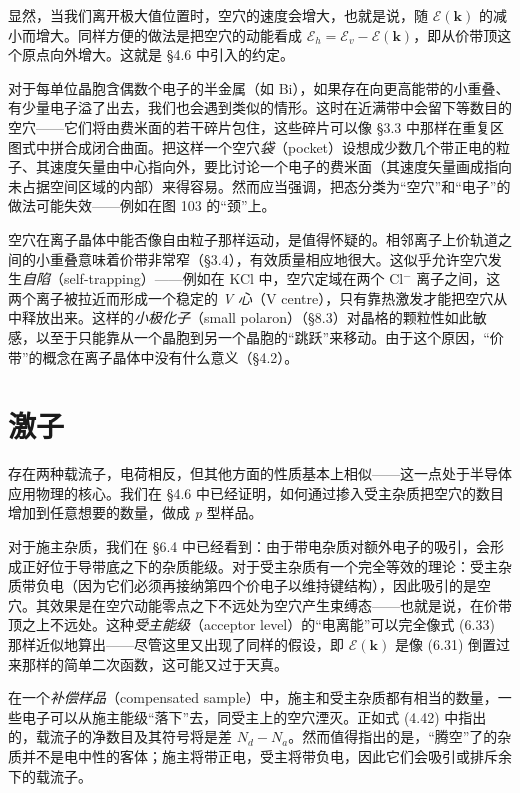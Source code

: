 显然，当我们离开极大值位置时，空穴的速度会增大，也就是说，随 $\mathcal{E}(\mathbf{k})$ 的减小而增大。同样方便的做法是把空穴的动能看成 $\mathcal{E}_{h}=\mathcal{E}_{v}-\mathcal{E}(\mathbf{k})$，即从价带顶这个原点向外增大。这就是 §4.6 中引入的约定。

对于每单位晶胞含偶数个电子的半金属（如 Bi），如果存在向更高能带的小重叠、有少量电子溢了出去，我们也会遇到类似的情形。这时在近满带中会留下等数目的空穴——它们将由费米面的若干碎片包住，这些碎片可以像 §3.3 中那样在重复区图式中拼合成闭合曲面。把这样一个空穴\emph{袋}（pocket）设想成少数几个带正电的粒子、其速度矢量由中心指向外，要比讨论一个电子的费米面（其速度矢量画成指向未占据空间区域的内部）来得容易。然而应当强调，把态分类为“空穴”和“电子”的做法可能失效——例如在图 103 的“颈”上。

空穴在离子晶体中能否像自由粒子那样运动，是值得怀疑的。相邻离子上价轨道之间的小重叠意味着价带非常窄（§3.4），有效质量相应地很大。这似乎允许空穴发生\emph{自陷}（self-trapping）——例如在 KCl 中，空穴定域在两个 Cl$^{-}$ 离子之间，这两个离子被拉近而形成一个稳定的 \emph{V 心}（V centre），只有靠热激发才能把空穴从中释放出来。这样的\emph{小极化子}（small polaron）（§8.3）对晶格的颗粒性如此敏感，以至于只能靠从一个晶胞到另一个晶胞的“跳跃”来移动。由于这个原因，“价带”的概念在离子晶体中没有什么意义（§4.2）。

\section{激子}

存在两种载流子，电荷相反，但其他方面的性质基本上相似——这一点处于半导体应用物理的核心。我们在 §4.6 中已经证明，如何通过掺入受主杂质把空穴的数目增加到任意想要的数量，做成 \emph{p} 型样品。


对于施主杂质，我们在 §6.4 中已经看到：由于带电杂质对额外电子的吸引，会形成正好位于导带底之下的杂质能级。对于受主杂质有一个完全等效的理论：受主杂质带负电（因为它们必须再接纳第四个价电子以维持键结构），因此吸引的是空穴。其效果是在空穴动能零点之下不远处为空穴产生束缚态——也就是说，在价带顶之上不远处。这种\emph{受主能级}（acceptor level）的“电离能”可以完全像式 (6.33) 那样近似地算出——尽管这里又出现了同样的假设，即 $\mathcal{E}(\mathbf{k})$ 是像 (6.31) 倒置过来那样的简单二次函数，这可能又过于天真。

在一个\emph{补偿样品}（compensated sample）中，施主和受主杂质都有相当的数量，一些电子可以从施主能级“落下”去，同受主上的空穴湮灭。正如式 (4.42) 中指出的，载流子的净数目及其符号将是差 $N_{d}-N_{a}$。然而值得指出的是，“腾空”了的杂质并不是电中性的客体；施主将带正电，受主将带负电，因此它们会吸引或排斥余下的载流子。

